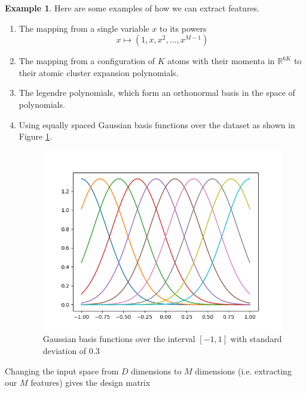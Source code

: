 \documentclass{article}
\theoremstyle{definition}
\newtheorem{example}{Example}[section]
\begin{document}
    \begin{example}
      Here are some examples of how we can extract features. 
      \begin{enumerate}
        \item The mapping from a single variable $x$ to its powers 
          \[x \mapsto (1, x, x^2, \ldots, x^{M-1})\]

        \item The mapping from a configuration of $K$ atoms with their momenta in $\mathbb{R}^{6K}$ to their atomic cluster expansion polynomials. 

        \item The legendre polynomials, which form an orthonormal basis in the space of polynomials. 

        \item Using equally spaced Gaussian basis functions over the dataset as shown in Figure \ref{fig:Gaussian_basis_functions}. 
        \begin{figure}
            \centering
            \includegraphics[scale=0.5]{img/Gaussian_basis_functions.png}
            \caption{Gaussian basis functions over the interval $[-1, 1]$ with standard deviation of $0.3$}
            \label{fig:Gaussian_basis_functions}
        \end{figure}
      \end{enumerate}
    \end{example}

    Changing the input space from $D$ dimensions to $M$ dimensions (i.e. extracting our $M$ features) gives the design matrix 
\end{document}
